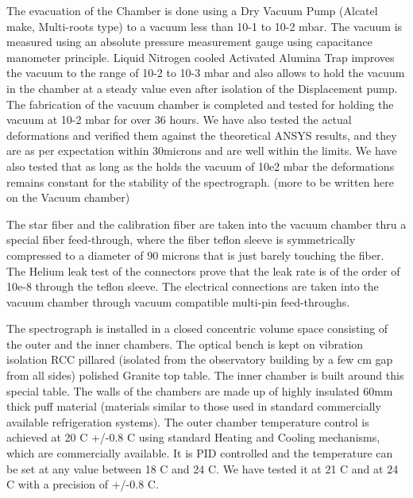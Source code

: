 \documentclass[12pt,preprint]{emulateapj}
\begin{document}
The evacuation of the Chamber is done using a Dry Vacuum Pump (Alcatel make, Multi-roots type) to a vacuum less than 10-1 to 10-2 mbar.  The vacuum is measured using an absolute pressure measurement gauge using capacitance manometer principle.  Liquid Nitrogen cooled Activated Alumina Trap improves the vacuum to the range of 10-2 to 10-3 mbar and also allows to hold the vacuum in the chamber at a steady value even after isolation of the Displacement pump.  The fabrication of the vacuum chamber is completed and tested for holding the vacuum at 10-2 mbar for over 36 hours. We have also tested the actual deformations and verified them against the theoretical ANSYS results, and they are as per expectation within 30microns and are well within the limits. We have also tested that as long as the holds the vacuum of 10e2 mbar the deformations remains constant for the stability of the spectrograph. (more to be written here on the Vacuum chamber)

The star fiber and the calibration fiber are taken into the vacuum chamber thru a special fiber feed-through, where the fiber teflon sleeve is symmetrically compressed to a diameter of 90 microns that is just barely touching the fiber. The Helium leak test of the connectors prove that the leak rate is of the order of 10e-8 through the teflon sleeve. The electrical connections are taken into the vacuum chamber through vacuum compatible multi-pin feed-throughs.

The spectrograph is installed in a closed concentric volume space consisting of the outer and the inner chambers. The optical bench is kept on vibration isolation RCC pillared (isolated from the observatory building by a few cm gap from all sides) polished Granite top table. The inner chamber is built around this special table. The walls of the chambers are made up of highly insulated 60mm thick puff material (materials similar to those used in standard commercially available refrigeration systems). The outer chamber temperature control is achieved at 20 C +/-0.8 C using standard Heating and Cooling mechanisms, which are commercially available. It is PID controlled and the temperature can be set at any value between 18 C and 24 C. We have tested it at 21 C and at 24 C with a precision of +/-0.8 C.
\end{document}
